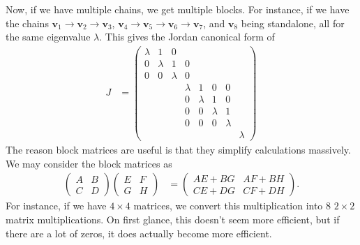 \documentclass[10pt]{mypackage}
\begin{document}
\begin{example}
  Now, if we have multiple chains, we get multiple blocks. For instance, if we have the chains $\mathbf{v}_1 \rightarrow \mathbf{v}_2 \rightarrow \mathbf{v}_3$, $\mathbf{v}_4\rightarrow \mathbf{v}_5 \rightarrow \mathbf{v}_6 \to \mathbf{v}_7$, and $\mathbf{v}_8$ being standalone, all for the same eigenvalue $\lambda$. This gives the Jordan canonical form of
  \begin{align*}
    J &= \begin{pmatrix}
\lambda & 1 & 0 &  &  &  &  &  \\
0 & \lambda & 1 & 0 &  &  &  &  \\
0 & 0 & \lambda & 0 &  &  &  &  \\
 &  &  & \lambda & 1 & 0 & 0 &  \\
 &  &  & 0 & \lambda & 1 & 0 &  \\
 &  &  & 0 & 0 & \lambda & 1 &  \\
 &  &  & 0 & 0 & 0 & \lambda &  \\
 &  &  &  &  &  &  & \lambda 
\end{pmatrix} 
  \end{align*}
  The reason block matrices are useful is that they simplify calculations massively. We may consider the block matrices as
  \begin{align*}
    \begin{pmatrix}A & B \\ C & D\end{pmatrix} \begin{pmatrix}E & F \\ G & H\end{pmatrix} &= \begin{pmatrix}AE + BG & AF + BH \\ CE + DG & CF + DH\end{pmatrix}.
  \end{align*}
  For instance, if we have $4\times 4$ matrices, we convert this multiplication into 8 $2\times 2$ matrix multiplications. On first glance, this doesn't seem more efficient, but if there are a lot of zeros, it does actually become more efficient.
\end{example}
\end{document}
